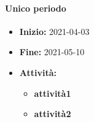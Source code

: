 \paragraph[Unico periodo]{Unico periodo}
\begin{itemize}
    \item [] \textbf{Inizio:} 2021-04-03
    \item [] \textbf{Fine:} 2021-05-10
    \item [] \textbf{Attività:}
          \begin{itemize}
            \item \textbf{attività1}
            \item \textbf{attività2}
          \end{itemize}
\end{itemize}